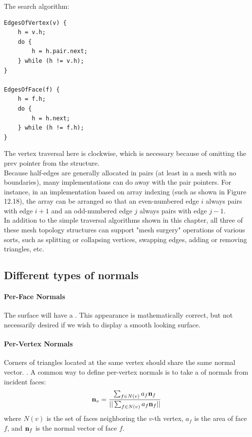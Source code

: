 \documentclass[11pt]{article}
\numberwithin{equation}{section}
\begin{document}
The search algorithm:
\begin{framed}
\begin{verbatim}
EdgesOfVertex(v) { 
	h = v.h;
	do {
		h = h.pair.next;
	} while (h != v.h); 
}

EdgesOfFace(f) { 
	h = f.h;
	do {
		h = h.next;
	} while (h != f.h); 
}
\end{verbatim}
\end{framed}

The vertex traversal here is clockwise, which is necessary because of omitting the prev pointer from the structure.\\
Because half-edges are generally allocated in pairs (at least in a mesh with no boundaries), many implementations can do away with the pair pointers. For instance, in an implementation based on array indexing (such as shown in Figure 12.18), the array can be arranged so that an even-numbered edge $i$ always pairs with edge $i + 1$ and an odd-numbered edge $j$ always pairs with edge $j-1$.\\
In addition to the simple traversal algorithms shown in this chapter, all three of these mesh topology structures can support "mesh surgery" operations of various sorts, such as splitting or collapsing vertices, swapping edges, adding or removing triangles, etc.
\subsection{Different types of normals}
\paragraph{Per-Face Normals}
The surface will have a . This appearance is mathematically correct, but not necessarily desired if we wish to display a smooth looking surface.
\paragraph{Per-Vertex Normals}
Corners of triangles located at the same vertex should share the same normal vector. . A common way to define per-vertex normals is to take a  of normals from incident faces:
\begin{equation}
	\textbf{n}_{v} = \frac{\sum_{f\in N(v)} a_f\textbf{n}_{f}}{||\sum_{f\in N(v)} a_f\textbf{n}_{f}||}
\end{equation}
where $N(v)$ is the set of faces neighboring the $v$-th vertex, $a_f$ is the area of face $f$, and $\textbf{n}_f$ is the normal vector of face $f$.
\end{document}
